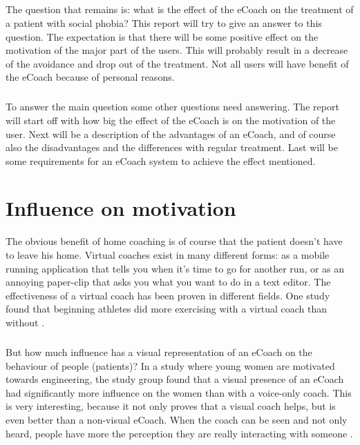 \documentclass[english,a4paper,pdftex]{report}
\begin{document}
\paragraph{}
The question that remains is: what is the effect of the eCoach on the treatment of a patient with social phobia? This report will try to give an answer to this question. The expectation is that there will be some positive effect on the motivation of the major part of the users. This will probably result in a decrease of the avoidance and drop out of the treatment. Not all users will have benefit of the eCoach because of personal reasons.
\paragraph{}
To answer the main question some other questions need answering. The report will start off with how big the effect of the eCoach is on the motivation of the user. Next will be a description of the advantages of an eCoach, and of course also the disadvantages and the differences with regular treatment. Last will be some requirements for an eCoach system to achieve the effect mentioned.




\chapter{Influence on motivation}
The obvious benefit of home coaching is of course that the patient doesn't have to leave his home. Virtual coaches exist in many different forms: as a mobile running application that tells you when it's time to go for another run, or as an annoying paper-clip that asks you what you want to do in a text editor.  The effectiveness of a virtual coach has been proven in different fields. One study found that beginning athletes did more exercising with a virtual coach than without \cite{eyck2006effect}. 
\paragraph{}
But how much influence has a visual representation of an eCoach on the behaviour of people (patients)? In a study \cite{rosenberg2007importance} where young women are motivated towards engineering, the study group found that a visual presence of an eCoach had significantly more influence on the women than with a voice-only coach. This is very interesting, because it not only proves that a visual coach helps, but is even better than a non-visual eCoach. When the coach can be seen and not only heard, people have more the perception they are really interacting with someone \cite{baylor2009promoting}. 
\end{document}
